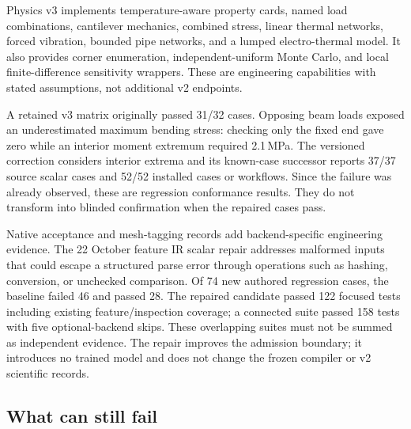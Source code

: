 \documentclass[10pt]{article}
\begin{document}
Physics v3 implements temperature-aware property cards, named load
combinations, cantilever mechanics, combined stress, linear thermal networks,
forced vibration, bounded pipe networks, and a lumped electro-thermal model.
It also provides corner enumeration, independent-uniform Monte Carlo, and
local finite-difference sensitivity wrappers. These are engineering
capabilities with stated assumptions, not additional v2 endpoints.

A retained v3 matrix originally passed 31/32 cases. Opposing beam loads
exposed an underestimated maximum bending stress: checking only the fixed
end gave zero while an interior moment extremum required 2.1\,MPa. The
versioned correction considers interior extrema and its known-case
successor reports 37/37 source scalar cases and 52/52 installed cases or
workflows. Since the failure was already observed, these are regression
conformance results. They do not transform into blinded confirmation when
the repaired cases pass.

Native acceptance and mesh-tagging records add backend-specific engineering
evidence. The 22 October feature IR scalar repair addresses malformed inputs
that could escape a structured parse error through operations such as hashing,
conversion, or unchecked comparison. Of 74 new authored regression cases,
the baseline failed 46 and passed 28. The repaired candidate passed 122
focused tests including existing feature/inspection coverage; a connected
suite passed 158 tests with five optional-backend skips. These overlapping
suites must not be summed as independent evidence. The repair improves the
admission boundary; it introduces no trained model and does not change the
frozen compiler or v2 scientific records.

\subsection{What can still fail}
\end{document}

